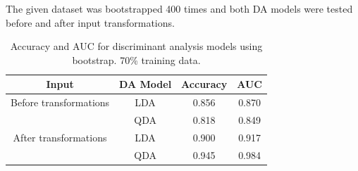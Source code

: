 \documentclass[../../project.tex]{subfiles}
\begin{document}
	The given dataset was bootstrapped 400 times and both DA models were tested before and after input transformations.
	\begin{table}[h!]
		\centering
		\begin{tabular}{cccc}
			Input & DA Model & Accuracy & AUC \\
			\midrule
			Before transformations
			& LDA & 0.856 & 0.870 \\
		    & QDA & 0.818 & 0.849 \\
			\midrule
			After transformations
			& LDA & 0.900 & 0.917 \\
			& QDA & 0.945 & 0.984 \\
		\end{tabular}
		\caption{Accuracy and AUC for discriminant analysis models using bootstrap. 70\% training data.}
		\label{tab:discanal_table_70}
	\end{table}
\end{document}
